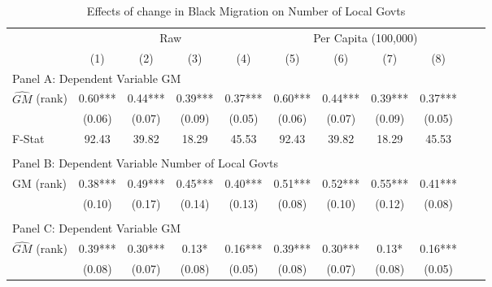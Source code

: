  \begin{table}[htbp]\centering {} \begin{threeparttable} \caption{Effects of change in Black Migration on Number of Local Govts} \begin{tabular}{l*{10}{c}} \toprule
                &\multicolumn{4}{c}{Raw}                                    &\multicolumn{4}{c}{Per Capita (100,000)}                   \\\cmidrule(lr){2-5}\cmidrule(lr){6-9}
                &\multicolumn{1}{c}{(1)}   &\multicolumn{1}{c}{(2)}   &\multicolumn{1}{c}{(3)}   &\multicolumn{1}{c}{(4)}   &\multicolumn{1}{c}{(5)}   &\multicolumn{1}{c}{(6)}   &\multicolumn{1}{c}{(7)}   &\multicolumn{1}{c}{(8)}   \\
\cmidrule(lr){1-9}
\multicolumn{8}{l}{Panel A: Dependent Variable GM}\\
\cmidrule(lr){1-9}
$\hat{GM}$ (rank)&       0.60***&       0.44***&       0.39***&       0.37***&       0.60***&       0.44***&       0.39***&       0.37***\\
                &     (0.06)   &     (0.07)   &     (0.09)   &     (0.05)   &     (0.06)   &     (0.07)   &     (0.09)   &     (0.05)   \\
\midrule
F-Stat          &      92.43   &      39.82   &      18.29   &      45.53   &      92.43   &      39.82   &      18.29   &      45.53   \\
\cmidrule[\heavyrulewidth](lr){1-9} \\ \cmidrule[\heavyrulewidth](lr){1-9}
\multicolumn{8}{l}{Panel B: Dependent Variable Number of Local Govts}\\
\cmidrule(lr){1-9}
GM  (rank)      &       0.38***&       0.49***&       0.45***&       0.40***&       0.51***&       0.52***&       0.55***&       0.41***\\
                &     (0.10)   &     (0.17)   &     (0.14)   &     (0.13)   &     (0.08)   &     (0.10)   &     (0.12)   &     (0.08)   \\
\cmidrule[\heavyrulewidth](lr){1-9} \\ \cmidrule[\heavyrulewidth](lr){1-9}
\multicolumn{8}{l}{Panel C: Dependent Variable GM}\\
\cmidrule(lr){1-9}
$\hat{GM}$ (rank)&       0.39***&       0.30***&       0.13*  &       0.16***&       0.39***&       0.30***&       0.13*  &       0.16***\\
                &     (0.08)   &     (0.07)   &     (0.08)   &     (0.05)   &     (0.08)   &     (0.07)   &     (0.08)   &     (0.05)   \\

\end{tabular}
\end{threeparttable}
\end{table}
